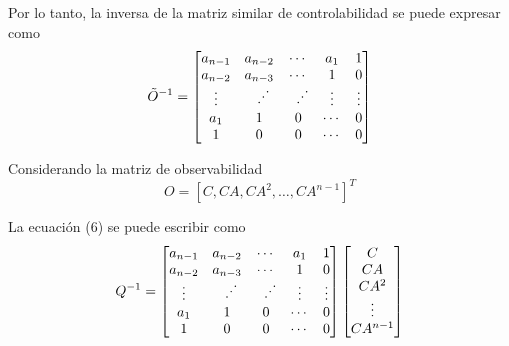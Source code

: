 Por lo tanto, la inversa de la matriz similar de controlabilidad se puede expresar como 
\[
    \tilde{O}^{-1} = 
    \begin{bmatrix}
        a_{n-1} & a_{n-2} & \cdots & a_{1} & 1 \\
        a_{n-2} & a_{n-3} & \cdots & 1 & 0\\
        \vdots & \rotatebox{90}{\(\ddots\)} & \rotatebox{90}{\(\ddots\)} & \vdots & \vdots\\
        a_{1} & 1 & 0 & \cdots & 0\\
        1 & 0 & 0 & \cdots & 0
    \end{bmatrix}
\]

Considerando la matriz de observabilidad 
\[
    O = [C, CA, CA^{2}, \ldots, CA^{n-1}]^{T}
\]

La ecuación (6) se puede escribir como
\[
    Q^{-1} =
    \begin{bmatrix}
    a_{n-1} & a_{n-2} & \cdots & a_{1} & 1 \\
    a_{n-2} & a_{n-3} & \cdots & 1 & 0\\
    \vdots & \rotatebox{90}{\(\ddots\)} & \rotatebox{90}{\(\ddots\)} & \vdots & \vdots\\
    a_{1} & 1 & 0 & \cdots & 0\\
    1 & 0 & 0 & \cdots & 0
    \end{bmatrix}
    \begin{bmatrix}
        C\\
        CA\\
        CA^{2}\\
        \vdots\\
        CA^{n-1}
    \end{bmatrix}
\]